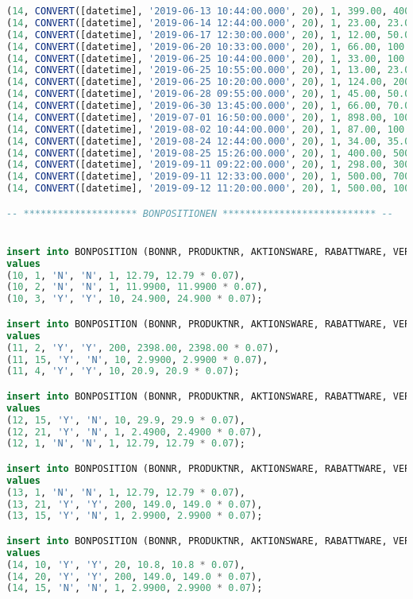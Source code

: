 \begin{lstlisting}[language=SQL]
(14, CONVERT([datetime], '2019-06-13 10:44:00.000', 20), 1, 399.00, 400.00),
(14, CONVERT([datetime], '2019-06-14 12:44:00.000', 20), 1, 23.00, 23.00),
(14, CONVERT([datetime], '2019-06-17 12:30:00.000', 20), 1, 12.00, 50.00),
(14, CONVERT([datetime], '2019-06-20 10:33:00.000', 20), 1, 66.00, 100.00),
(14, CONVERT([datetime], '2019-06-25 10:44:00.000', 20), 1, 33.00, 100.00),
(14, CONVERT([datetime], '2019-06-25 10:55:00.000', 20), 1, 13.00, 23.00),
(14, CONVERT([datetime], '2019-06-25 10:20:00.000', 20), 1, 124.00, 200.00),
(14, CONVERT([datetime], '2019-06-28 09:55:00.000', 20), 1, 45.00, 50.00),
(14, CONVERT([datetime], '2019-06-30 13:45:00.000', 20), 1, 66.00, 70.00),
(14, CONVERT([datetime], '2019-07-01 16:50:00.000', 20), 1, 898.00, 1000.00),
(14, CONVERT([datetime], '2019-08-02 10:44:00.000', 20), 1, 87.00, 100.00),
(14, CONVERT([datetime], '2019-08-24 12:44:00.000', 20), 1, 34.00, 35.00),
(14, CONVERT([datetime], '2019-08-25 15:26:00.000', 20), 1, 400.00, 500.00),
(14, CONVERT([datetime], '2019-09-11 09:22:00.000', 20), 1, 298.00, 300.00),
(14, CONVERT([datetime], '2019-09-11 12:33:00.000', 20), 1, 500.00, 700.00),
(14, CONVERT([datetime], '2019-09-12 11:20:00.000', 20), 1, 500.00, 100.00)

-- ******************** BONPOSITIONEN *************************** --


insert into BONPOSITION (BONNR, PRODUKTNR, AKTIONSWARE, RABATTWARE, VERKAUFSMENGE, VERKAUFSPREIS, MWST)
values
(10, 1, 'N', 'N', 1, 12.79, 12.79 * 0.07),
(10, 2, 'N', 'N', 1, 11.9900, 11.9900 * 0.07),
(10, 3, 'Y', 'Y', 10, 24.900, 24.900 * 0.07);

insert into BONPOSITION (BONNR, PRODUKTNR, AKTIONSWARE, RABATTWARE, VERKAUFSMENGE, VERKAUFSPREIS, MWST)
values
(11, 2, 'Y', 'Y', 200, 2398.00, 2398.00 * 0.07),
(11, 15, 'Y', 'N', 10, 2.9900, 2.9900 * 0.07),
(11, 4, 'Y', 'Y', 10, 20.9, 20.9 * 0.07);

insert into BONPOSITION (BONNR, PRODUKTNR, AKTIONSWARE, RABATTWARE, VERKAUFSMENGE, VERKAUFSPREIS, MWST)
values
(12, 15, 'Y', 'N', 10, 29.9, 29.9 * 0.07),
(12, 21, 'Y', 'N', 1, 2.4900, 2.4900 * 0.07),
(12, 1, 'N', 'N', 1, 12.79, 12.79 * 0.07);

insert into BONPOSITION (BONNR, PRODUKTNR, AKTIONSWARE, RABATTWARE, VERKAUFSMENGE, VERKAUFSPREIS, MWST)
values
(13, 1, 'N', 'N', 1, 12.79, 12.79 * 0.07),
(13, 21, 'Y', 'Y', 200, 149.0, 149.0 * 0.07),
(13, 15, 'Y', 'N', 1, 2.9900, 2.9900 * 0.07);

insert into BONPOSITION (BONNR, PRODUKTNR, AKTIONSWARE, RABATTWARE, VERKAUFSMENGE, VERKAUFSPREIS, MWST)
values
(14, 10, 'Y', 'Y', 20, 10.8, 10.8 * 0.07),
(14, 20, 'Y', 'Y', 200, 149.0, 149.0 * 0.07),
(14, 15, 'N', 'N', 1, 2.9900, 2.9900 * 0.07);


\end{lstlisting}
